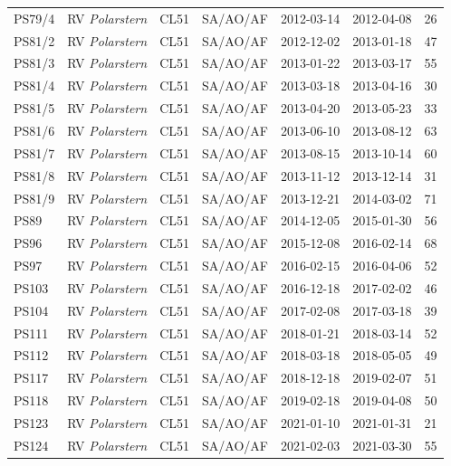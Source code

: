 \documentclass[draft]{agujournal2019}
\begin{document}
\begin{table}[p!]
\begin{tabular}{llllllr}
PS79/4   & RV \emph{Polarstern}          & CL51    & SA/AO/AF & 2012-03-14 & 2012-04-08 & 26 \\
PS81/2   & RV \emph{Polarstern}          & CL51    & SA/AO/AF & 2012-12-02 & 2013-01-18 & 47 \\
PS81/3   & RV \emph{Polarstern}          & CL51    & SA/AO/AF & 2013-01-22 & 2013-03-17 & 55 \\
PS81/4   & RV \emph{Polarstern}          & CL51    & SA/AO/AF & 2013-03-18 & 2013-04-16 & 30 \\
PS81/5   & RV \emph{Polarstern}          & CL51    & SA/AO/AF & 2013-04-20 & 2013-05-23 & 33 \\
PS81/6   & RV \emph{Polarstern}          & CL51    & SA/AO/AF & 2013-06-10 & 2013-08-12 & 63 \\
PS81/7   & RV \emph{Polarstern}          & CL51    & SA/AO/AF & 2013-08-15 & 2013-10-14 & 60 \\
PS81/8   & RV \emph{Polarstern}          & CL51    & SA/AO/AF & 2013-11-12 & 2013-12-14 & 31 \\
PS81/9   & RV \emph{Polarstern}          & CL51    & SA/AO/AF & 2013-12-21 & 2014-03-02 & 71 \\
PS89     & RV \emph{Polarstern}          & CL51    & SA/AO/AF & 2014-12-05 & 2015-01-30 & 56 \\
PS96     & RV \emph{Polarstern}          & CL51    & SA/AO/AF & 2015-12-08 & 2016-02-14 & 68 \\
PS97     & RV \emph{Polarstern}          & CL51    & SA/AO/AF & 2016-02-15 & 2016-04-06 & 52 \\
PS103    & RV \emph{Polarstern}          & CL51    & SA/AO/AF & 2016-12-18 & 2017-02-02 & 46 \\
PS104    & RV \emph{Polarstern}          & CL51    & SA/AO/AF & 2017-02-08 & 2017-03-18 & 39 \\
PS111    & RV \emph{Polarstern}          & CL51    & SA/AO/AF & 2018-01-21 & 2018-03-14 & 52 \\
PS112    & RV \emph{Polarstern}          & CL51    & SA/AO/AF & 2018-03-18 & 2018-05-05 & 49 \\
PS117    & RV \emph{Polarstern}          & CL51    & SA/AO/AF & 2018-12-18 & 2019-02-07 & 51 \\
PS118    & RV \emph{Polarstern}          & CL51    & SA/AO/AF & 2019-02-18 & 2019-04-08 & 50 \\
PS123    & RV \emph{Polarstern}          & CL51    & SA/AO/AF & 2021-01-10 & 2021-01-31 & 21 \\
PS124    & RV \emph{Polarstern}          & CL51    & SA/AO/AF & 2021-02-03 & 2021-03-30 & 55 \\

\end{tabular}
\end{table}
\end{document}
